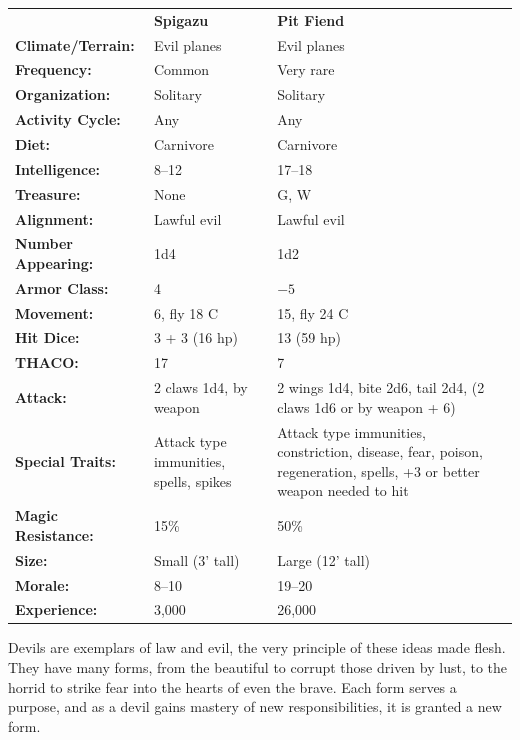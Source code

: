 \begin{multicols}{2}
\begin{minipage}{\columnwidth}
\noindent \begin{tabular}{p{}g{.24\columnwidth}p{.24\columnwidth}}
							& \textbf{Spigazu}	& \textbf{Pit Fiend}	\\
\textbf{Climate/Terrain:}	& Evil planes	& Evil planes	\\
\textbf{Frequency:} 		& Common	& Very rare	\\
\textbf{Organization:} 		& Solitary	& Solitary	\\
\textbf{Activity Cycle:} 	& Any	& Any	\\
\textbf{Diet:} 				& Carnivore	& Carnivore	\\
\textbf{Intelligence:} 		& 8--12	& 17--18	\\
\textbf{Treasure:} 			& None	& G, W	\\
\textbf{Alignment:} 		& Lawful evil	& Lawful evil	\\
\hline
\textbf{Number Appearing:} 	& 1d4	& 1d2	\\
\textbf{Armor Class:} 		& 4	& $-5$	\\
\textbf{Movement:} 			& 6, fly 18 C	& 15, fly 24 C	\\
\textbf{Hit Dice:} 			& 3 + 3 (16 hp)	& 13 (59 hp)	\\
\textbf{THACO:} 			& 17	& 7	\\
\textbf{Attack:} 			& 2 claws 1d4, by weapon	& 2 wings 1d4, bite 2d6, tail 2d4, (2 claws 1d6 or by weapon + 6) \\
\textbf{Special Traits:} & Attack type immunities, spells, spikes	& Attack type immunities, constriction, disease, fear, poison, regeneration, spells, +3 or better weapon needed to hit	\\
\textbf{Magic Resistance:} 	& 15\%	& 50\%	\\
\textbf{Size:} 				& Small (3' tall)	& Large (12' tall)	\\
\textbf{Morale:} 			& 8--10	& 19--20	\\
\textbf{Experience:} 		& 3,000	& 26,000	\\ %
\end{tabular}

\end{minipage}

Devils are exemplars of law and evil, the very principle of these ideas made flesh. They have many forms, from the beautiful to corrupt those driven by lust, to the horrid to strike fear into the hearts of even the brave. Each form serves a purpose, and as a devil gains mastery of new responsibilities, it is granted a new form.


\end{multicols}
